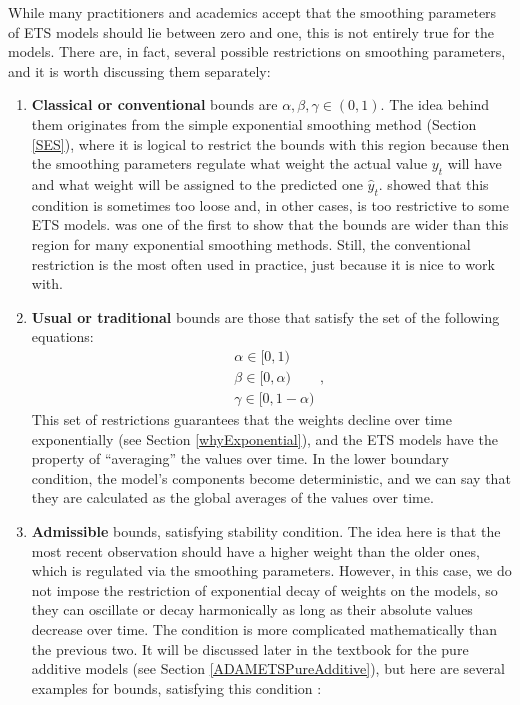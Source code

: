 \documentclass[
]{book}
\theoremstyle{definition}
\theoremstyle{definition}
\theoremstyle{definition}
\theoremstyle{definition}
\theoremstyle{remark}
\begin{document}
While many practitioners and academics accept that the smoothing parameters of ETS models should lie between zero and one, this is not entirely true for the models. There are, in fact, several possible restrictions on smoothing parameters, and it is worth discussing them separately:

\begin{enumerate}
\def\labelenumi{\arabic{enumi}.}
\item
  \textbf{Classical or conventional} bounds are \(\alpha, \beta, \gamma \in (0,1)\). The idea behind them originates from the simple exponential smoothing method (Section \ref{SES}), where it is logical to restrict the bounds with this region because then the smoothing parameters regulate what weight the actual value \(y_t\) will have and what weight will be assigned to the predicted one \(\hat{y}_t\). \citet{Hyndman2008b} showed that this condition is sometimes too loose and, in other cases, is too restrictive to some ETS models. \citet{Brenner1968} was one of the first to show that the bounds are wider than this region for many exponential smoothing methods. Still, the conventional restriction is the most often used in practice, just because it is nice to work with.
\item
  \textbf{Usual or traditional} bounds are those that satisfy the set of the following equations:
  \begin{equation}
    \begin{aligned}
    &\alpha \in [0, 1)\\
    &\beta \in [0, \alpha) \\
    &\gamma \in [0, 1-\alpha)
    \end{aligned},
    \label{eq:ETSUsualBounds}
  \end{equation}
  This set of restrictions guarantees that the weights decline over time exponentially (see Section \ref{whyExponential}), and the ETS models have the property of ``averaging'' the values over time. In the lower boundary condition, the model's components become deterministic, and we can say that they are calculated as the global averages of the values over time.
\item
  \textbf{Admissible} bounds, satisfying stability condition. The idea here is that the most recent observation should have a higher weight than the older ones, which is regulated via the smoothing parameters. However, in this case, we do not impose the restriction of exponential decay of weights on the models, so they can oscillate or decay harmonically as long as their absolute values decrease over time. The condition is more complicated mathematically than the previous two. It will be discussed later in the textbook for the pure additive models (see Section \ref{ADAMETSPureAdditive}), but here are several examples for bounds, satisfying this condition \citep[from Chapter 10 of][]{Hyndman2008b}:
\end{enumerate}
\end{document}
